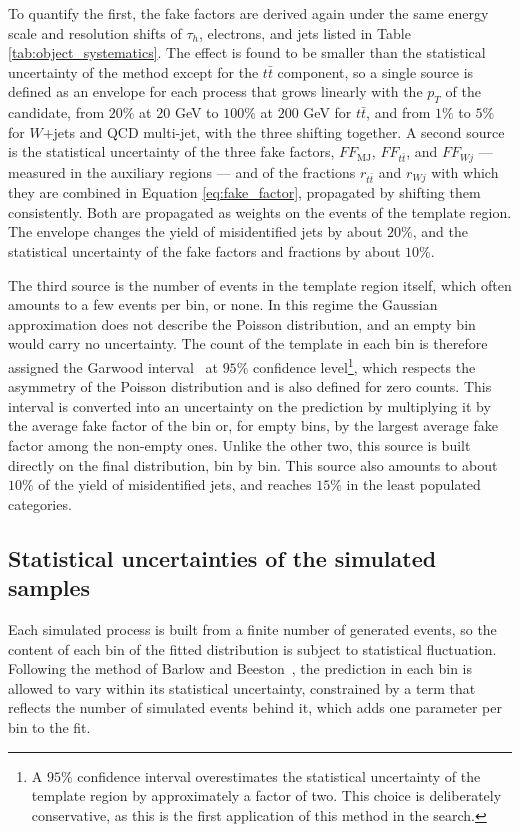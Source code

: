 To quantify the first, the fake factors are derived again under the same energy scale and resolution shifts of $\tau_h$, electrons, and jets listed in Table \ref{tab:object_systematics}. The effect is found to be smaller than the statistical uncertainty of the method except for the $t\bar{t}$ component, so a single source is defined as an envelope for each process that grows linearly with the $p_T$ of the candidate, from $20\%$ at $20$ GeV to $100\%$ at $200$ GeV for $t\bar{t}$, and from $1\%$ to $5\%$ for $W$+jets and QCD multi-jet, with the three shifting together. A second source is the statistical uncertainty of the three fake factors, $FF_\text{MJ}$, $FF_{t\bar{t}}$, and $FF_{Wj}$ — measured in the auxiliary regions — and of the fractions $r_{t\bar{t}}$ and $r_{Wj}$ with which they are combined in Equation \ref{eq:fake_factor}, propagated by shifting them consistently. Both are propagated as weights on the events of the template region. The envelope changes the yield of misidentified jets by about $20\%$, and the statistical uncertainty of the fake factors and fractions by about $10\%$.

The third source is the number of events in the template region itself, which often amounts to a few events per bin, or none. In this regime the Gaussian approximation does not describe the Poisson distribution, and an empty bin would carry no uncertainty. The count of the template in each bin is therefore assigned the Garwood interval~\cite{Garwood:1936} at $95\%$ confidence level\footnote{A $95\%$ confidence interval overestimates the statistical uncertainty of the template region by approximately a factor of two. This choice is deliberately conservative, as this is the first application of this method in the search.}, which respects the asymmetry of the Poisson distribution and is also defined for zero counts. This interval is converted into an uncertainty on the prediction by multiplying it by the average fake factor of the bin or, for empty bins, by the largest average fake factor among the non-empty ones. Unlike the other two, this source is built directly on the final distribution, bin by bin. This source also amounts to about $10\%$ of the yield of misidentified jets, and reaches $15\%$ in the least populated categories.



\subsection{Statistical uncertainties of the simulated samples}
%
Each simulated process is built from a finite number of generated events, so the content of each bin of the fitted distribution is subject to statistical fluctuation. Following the method of Barlow and Beeston~\cite{Barlow:1993dm}, the prediction in each bin is allowed to vary within its statistical uncertainty, constrained by a term that reflects the number of simulated events behind it, which adds one parameter per bin to the fit.

